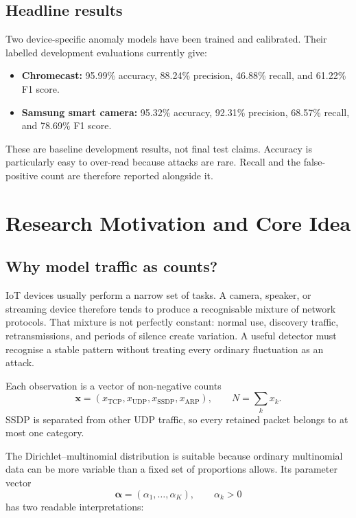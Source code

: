 \documentclass[11pt,a4paper]{article}
\begin{document}
\subsection{Headline results}

Two device-specific anomaly models have been trained and calibrated. Their labelled development evaluations currently give:

\begin{itemize}
  \item \textbf{Chromecast:} 95.99\% accuracy, 88.24\% precision, 46.88\% recall, and 61.22\% F1 score.
  \item \textbf{Samsung smart camera:} 95.32\% accuracy, 92.31\% precision, 68.57\% recall, and 78.69\% F1 score.
\end{itemize}

These are baseline development results, not final test claims. Accuracy is particularly easy to over-read because attacks are rare. Recall and the false-positive count are therefore reported alongside it.

\section{Research Motivation and Core Idea}

\subsection{Why model traffic as counts?}

IoT devices usually perform a narrow set of tasks. A camera, speaker, or streaming device therefore tends to produce a recognisable mixture of network protocols. That mixture is not perfectly constant: normal use, discovery traffic, retransmissions, and periods of silence create variation. A useful detector must recognise a stable pattern without treating every ordinary fluctuation as an attack.

Each observation is a vector of non-negative counts
\[
\mathbf{x}=(x_{\mathrm{TCP}},x_{\mathrm{UDP}},x_{\mathrm{SSDP}},x_{\mathrm{ARP}}),
\qquad N=\sum_k x_k.
\]
SSDP is separated from other UDP traffic, so every retained packet belongs to at most one category.

The Dirichlet--multinomial distribution is suitable because ordinary multinomial data can be more variable than a fixed set of proportions allows. Its parameter vector
\[
\boldsymbol{\alpha}=(\alpha_1,\ldots,\alpha_K), \qquad \alpha_k>0
\]
has two readable interpretations:
\end{document}
